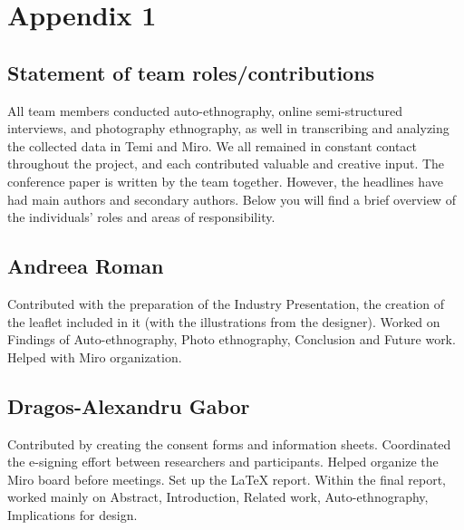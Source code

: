 \usepackage{balance}       %
\usepackage{graphics}      %
\usepackage[T1]{fontenc}   %
\usepackage{txfonts}
\usepackage{mathptmx}
\usepackage[pdflang={en-US},pdftex]{hyperref}
\usepackage{color}
\usepackage{booktabs}
\usepackage{textcomp}
\usepackage{lipsum}

\usepackage{comment} %

\section{Appendix 1}

\subsection{Statement of team roles/contributions}

All team members conducted auto-ethnography, online semi-structured interviews, and photography ethnography, as well in transcribing and analyzing the collected data in Temi and Miro. We all remained in constant contact throughout the project, and each contributed valuable and creative input. The conference paper is written by the team together. However, the headlines have had main authors and secondary authors. Below you will find a brief overview of the individuals' roles and areas of responsibility. 

\subsection{Andreea Roman}

Contributed with the preparation of the Industry Presentation, the creation of the leaflet included in it (with the illustrations from the designer). Worked on Findings of Auto-ethnography, Photo ethnography, Conclusion and Future work. Helped with Miro organization.  

\subsection{Dragos-Alexandru Gabor} 

Contributed by creating the consent forms and information sheets. Coordinated the e-signing effort between researchers and participants. Helped organize the Miro board before meetings. Set up the LaTeX report. Within the final report, worked mainly on Abstract, Introduction, Related work, Auto-ethnography, Implications for design. 

